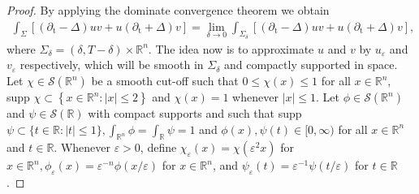 \documentclass[10pt,a4paper]{amsart}
\theoremstyle{remark}
\theoremstyle{definition}
\begin{document}
\begin{proof}
By applying the dominate convergence theorem we obtain
\begin{align}\label{eq_A2}
 \int_{\Sigma}\left[( \partial_{\mathrm{t}}-\Delta) u v+u {\left( \partial_{\mathrm{t}}+\Delta\right) v}\right]=\lim _{\delta \rightarrow 0} \int_{\Sigma_\delta}\left[( \partial_{\mathrm{t}}-\Delta) u v+u {\left( \partial_{\mathrm{t}}+\Delta\right) v}\right],  
\end{align}
where $\Sigma_\delta=(\delta, T-\delta) \times \mathbb{R}^n$. The idea now is to approximate $u$ and $v$ by $u_{\varepsilon}$ and $v_{\varepsilon}$ respectively, which will be smooth in $\Sigma_\delta$ and compactly supported in space. Let $\chi \in \mathcal{S}\left(\mathbb{R}^n\right)$ be a smooth cut-off such that $0 \leq \chi(x) \leq 1$ for all $x \in \mathbb{R}^n$, supp $\chi \subset\left\{x \in \mathbb{R}^n:|x| \leq 2\right\}$ and $\chi(x)=1$ whenever $|x| \leq 1$. Let $\phi \in \mathcal{S}\left(\mathbb{R}^n\right)$ and $\psi \in \mathcal{S}(\mathbb{R})$ with compact supports and such that supp $\psi \subset\{t \in \mathbb{R}:|t| \leq 1\}, \int_{\mathbb{R}^n} \phi=\int_{\mathbb{R}} \psi=1$ and $\phi(x), \psi(t) \in[0, \infty)$ for all $x \in \mathbb{R}^n$ and $t \in \mathbb{R}$. Whenever $\varepsilon>0$, define $\chi_{\varepsilon}(x)=\chi(\varepsilon^2 x)$ for $x \in \mathbb{R}^n, \phi_{\varepsilon}(x)=\varepsilon^{-n} \phi(x / \varepsilon)$ for $x \in \mathbb{R}^n$, and $\psi_{\varepsilon}(t)=\varepsilon^{-1} \psi(t / \varepsilon)$ for $t \in \mathbb{R}$.


\end{proof}
\end{document}
